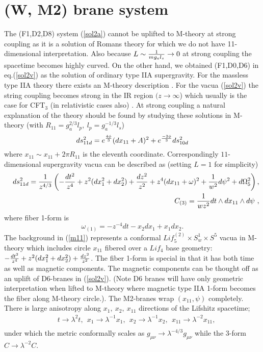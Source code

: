 \documentclass[12pt]{article}
\def\be{\begin{equation}} \def\ee{\end{equation}}
\def\bea{\begin{eqnarray}} \def\eea{\end{eqnarray}} \def\ba{\begin{array}}
\newcommand{\eqn}[1]{(\ref{#1})}
\def\m{\mu}
\def\n{\nu}
\def\br{\nonumber\\}
\begin{document}
  
\section{ (W, M2) brane system}
The (F1,D2,D8) system \eqn{sol2a} cannot be uplifted to M-theory at strong 
coupling as it is a solution of Romans theory for which we do not have
11-dimensional interpretation. Also because 
$L\sim {1\over m g_a l_s}\to 0$ at strong coupling
the spacetime becomes highly curved. On the other hand,  
we  obtained (F1,D0,D6) in eq.\eqn{sol2v} as the solution of
 ordinary type IIA supergravity. For the massless type IIA theory 
there exists an M-theory description \cite{Witten:1995ex}.
For the  vacua \eqn{sol2v} the string coupling becomes strong in 
the IR region $(z\to\infty$)
which usually is the case for CFT$_3$ (in relativistic cases also)
 \cite{itzhaki}.   
At strong coupling a natural explanation of the theory 
should be found by studying these
solutions  in M-theory (with $R_{11}=g_a^{2/3}l_p,~l_p=g_a^{-1/3}l_s$) 
\be\label{m11}
ds^2_{11d}=e^{4\phi\over 3}(dx_{11}+A)^2 +
e^{-2\phi\over 3}ds_{10d}^2 \ee
where $x_{11}\sim x_{11} +2\pi R_{11}$ is the eleventh coordinate.
Correspondingly $11$-dimensional supergravity    vacua can be described as
(setting $L=1$ for simplicity)
\bea\label{sol2v1}
&&ds^2_{11d}={1\over  z^{4/3}}\left(
- {dt^2\over  z^4}  +z^2(dx_1^2+dx_2^2)
+{dz^2\over z^2} 
+{z^4}(dx_{11}+\omega)^2+{1\over w^2} d\psi^2 + d\Omega_5^2  \right),\br
&& ~~~~ C_{(3)}=  {1\over w z^2}dt\wedge dx_{11}\wedge d\psi  \ ,
\eea 
where fiber 1-form is 
$$ \omega_{(1)}=-z^{-4} dt  -x_2dx_1 + x_1dx_2 .$$
The background in \eqn{m11} represents a conformal 
$Lif_5^{(2)} \times S^1_w\times S^5$ vacua in M-theory  which
includes  circle $x_{11}$  fibered over a $Lif_4$ base geometry:  
$- {dt^2\over  z^4}  +z^2(dx_1^2+dx_2^2)
+{dz^2\over z^2}$. The fiber 1-form is special in that it has
both time as well as  magnetic  components.
The magnetic components can be thought off as
 an uplift of  D6-branes in \eqn{sol2v}. (Note 
D6 branes will have only geometric interpretation when lifted to M-theory
 where magnetic type IIA 1-form
becomes the fiber along M-theory circle.). 
The  M2-branes   wrap $(x_{11},\psi)$ completely.
There is  large 
anisotropy along $x_1,~x_2,~x_{11}$ directions of the  Lifshitz spacetime; 
\bea\label{sca4}
&& t\to\lambda^2 t,~~ 
x_1\to\lambda^{-1} x_1,~~ 
x_2\to\lambda^{-1} x_2,~~ 
x_{11}\to\lambda^{-2} x_{11},~~ \br
\eea
under which the metric conformally scales  as 
$g_{\m\n} \to\lambda^{-4/3} g_{\m\n}$ while 
the 3-form $C \to\lambda^{-2} C$.
\end{document}

